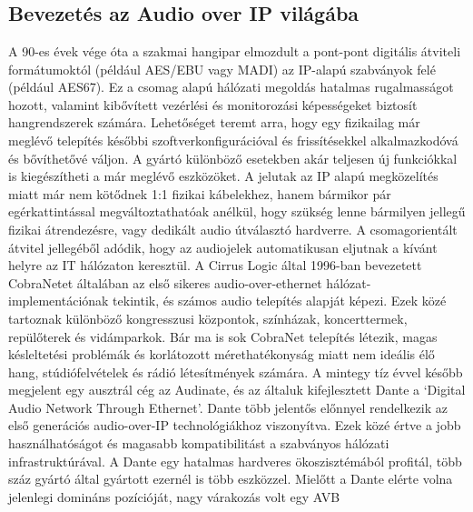 \chapter{\AudioOverIp}
\section{Bevezetés az Audio over IP világába}
A 90-es évek vége óta a szakmai hangipar elmozdult a pont-pont digitális
átviteli formátumoktól (például AES/EBU vagy MADI) az IP-alapú szabványok felé
(például AES67). Ez a csomag alapú hálózati megoldás hatalmas rugalmasságot
hozott, valamint kibővített vezérlési és monitorozási képességeket biztosít
hangrendszerek számára. Lehetőséget teremt arra, hogy egy fizikailag már meglévő
telepítés későbbi szoftverkonfigurációval és frissítésekkel alkalmazkodóvá és
bővíthetővé váljon. A gyártó különböző esetekben akár teljesen új funkciókkal is
kiegészítheti a már meglévő eszközöket. 
A jelutak az IP alapú megközelítés miatt már nem kötődnek 1:1 fizikai kábelekhez, hanem
bármikor pár egérkattintással megváltoztathatóak anélkül, hogy szükség lenne bármilyen
jellegű fizikai átrendezésre, vagy dedikált audio útválasztó hardverre. 
A csomagorientált átvitel jellegéből adódik, hogy az audiojelek automatikusan eljutnak 
a kívánt helyre az IT hálózaton keresztül. 
A Cirrus Logic által 1996-ban bevezetett CobraNetet
általában az első sikeres audio-over-ethernet hálózat-implementációnak tekintik,
és számos audio telepítés alapját képezi. Ezek közé tartoznak különböző kongresszusi központok,
színházak, koncerttermek, repülőterek és vidámparkok.
Bár ma is sok CobraNet telepítés létezik, magas késleltetési problémák és korlátozott mérethatékonyság
miatt nem ideális élő hang, stúdiófelvételek és rádió létesítmények számára.
A mintegy tíz évvel később megjelent egy ausztrál cég az Audinate, és az általuk kifejlesztett
Dante a `Digital Audio Network Through Ethernet'. Dante több jelentős
előnnyel rendelkezik az első generációs audio-over-IP technológiákhoz viszonyítva.
Ezek közé értve a jobb használhatóságot és magasabb kompatibilitást a szabványos
hálózati infrastruktúrával. A Dante egy hatalmas hardveres ökoszisztémából
profitál, több száz gyártó által gyártott ezernél is több eszközzel. 
Mielőtt a Dante elérte volna jelenlegi domináns pozícióját, nagy várakozás volt egy AVB
